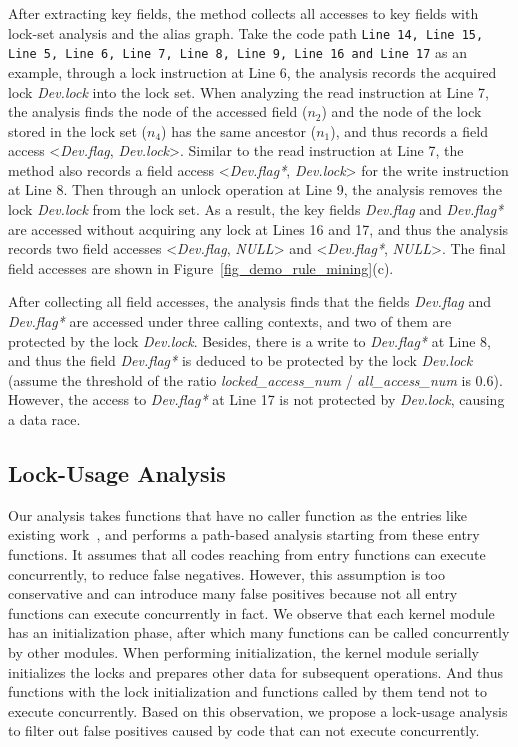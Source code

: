 After extracting key fields, the method collects all accesses to key fields 
with lock-set analysis and the alias graph. Take the code path {\tt Line 14, 
Line 15, Line 5, Line 6, Line 7, Line 8, Line 9, Line 16 and Line 17} as an 
example, through a lock instruction at Line 6, the analysis records the 
acquired lock {\em Dev.lock} into the lock set. When analyzing the read 
instruction at Line 7, the analysis finds the node of the accessed field 
($\mathit{n_2}$) and the node of the lock stored in the lock set 
($\mathit{n_4}$) has the same ancestor ($\mathit{n_1}$), and thus records a 
field access <{\em Dev.flag}, {\em Dev.lock}>. Similar to the read instruction 
at Line 7, the method also records a field access <{\em Dev.flag*}, {\em 
Dev.lock}> for the write instruction at Line 8. Then through an unlock 
operation at Line 9, the analysis removes the lock {\em Dev.lock} from the lock 
set. As a result, the key fields {\em Dev.flag} and {\em Dev.flag*} are 
accessed without acquiring any lock at Lines 16 and 17, and thus the analysis 
records two field accesses <{\em Dev.flag}, {\em NULL}> and <{\em Dev.flag*}, 
{\em NULL}>. The final field accesses are shown in 
Figure~\ref{fig_demo_rule_mining}(c).

After collecting all field accesses, the analysis finds that the fields {\em 
Dev.flag} and {\em Dev.flag*} are accessed under three calling contexts, and 
two of them are protected by the lock {\em Dev.lock}. Besides, there is a write 
to {\em Dev.flag*} at Line 8, and thus the field {\em Dev.flag*} is deduced to 
be protected by the lock {\em Dev.lock} (assume the threshold of the ratio {\em 
locked\_access\_num} / {\em all\_access\_num} is 0.6). However, the access to 
{\em Dev.flag*} at Line 17 is not protected by {\em Dev.lock}, causing a data 
race.

\subsection{Lock-Usage Analysis}
\label{subsec_lock_usage_analysis}
Our analysis takes functions that have no caller function as the entries like 
existing work~\cite{Li:ASPLOS22}, and performs a path-based analysis starting 
from these entry functions. It assumes that all codes reaching from entry 
functions can execute concurrently, to reduce false negatives. However, this 
assumption is too conservative and can introduce many false positives because 
not all entry functions can execute concurrently in fact. We observe that each 
kernel module has an initialization phase, after which many functions can be 
called concurrently by other modules. When performing initialization, the 
kernel module serially initializes the locks and prepares other data for 
subsequent operations. And thus functions with the lock initialization and 
functions called by them tend not to execute concurrently. Based on this 
observation, we propose a lock-usage analysis to filter out false positives 
caused by code that can not execute concurrently.

